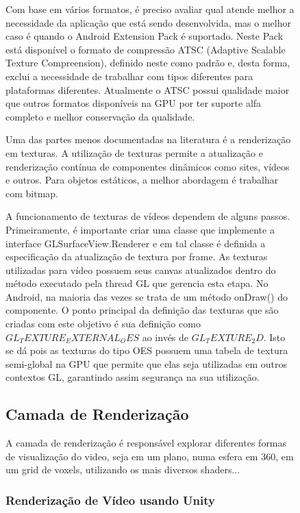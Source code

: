 \documentclass[sigconf]{acmart}
\begin{document}
\begin{figure}[h!]
Com base em vários formatos, é preciso avaliar qual atende melhor a necessidade da aplicação que está sendo desenvolvida, mas o melhor caso é quando o Android Extension Pack é suportado. Neste Pack está disponível o formato de compressão ATSC (Adaptive Scalable Texture Compreension), definido neste como padrão e, desta forma, exclui a necessidade de trabalhar com tipos diferentes para plataformas diferentes. Atualmente o ATSC possui qualidade maior que outros formatos disponíveis na GPU por ter suporte alfa completo e melhor conservação da qualidade.

Uma das partes menos documentadas na literatura é a renderização em texturas. A utilização de texturas permite a atualização e renderização contínua de componentes dinâmicos como sites, vídeos e outros. Para objetos estáticos, a melhor abordagem é trabalhar com bitmap.

A funcionamento de texturas de vídeos dependem de alguns passos. Primeiramente, é importante criar uma classe que implemente a interface GLSurfaceView.Renderer e em tal classe é definida a especificação da atualização de textura por frame. As texturas utilizadas para vídeo possuem seus canvas atualizados dentro do método executado pela thread GL que gerencia esta etapa. No Android, na maioria das vezes se trata de um método onDraw() do componente. O ponto principal da definição das texturas que são criadas com este objetivo é sua definição como $GL_TEXTURE_EXTERNAL_OES$ ao invés de $GL_TEXTURE_2D$. Isto se dá pois as texturas do tipo OES possuem uma tabela de textura semi-global na GPU que permite que elas seja utilizadas em outros contextos GL, garantindo assim segurança na sua utilização.

\subsection{Camada de Renderização} \label{sec-arch-subsec-render-layer}

A camada de renderização é responsável explorar diferentes formas de visualização do video, seja em um plano, numa esfera em 360, em um grid de voxels, utilizando os mais diversos shaders...


\subsubsection{Renderização de Vídeo usando Unity}


\end{figure}
\end{document}
